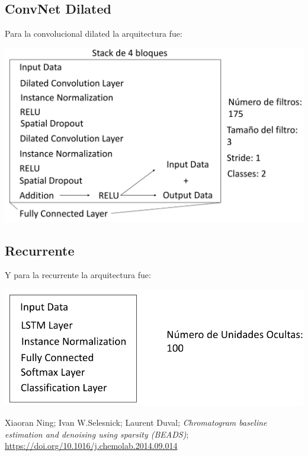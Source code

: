 \documentclass[a4paper,twocolumn]{article}
\begin{document}
\subsection{ConvNet Dilated}
Para la convolucional dilated la arquitectura fue:

	\includegraphics[trim={0cm 0cm 0cm 0cm}, clip,width=.5\textwidth]{./arqDilated.png}

\subsection{Recurrente}
Y para la recurrente la arquitectura fue:

\includegraphics[trim={0cm 0cm 0cm 0cm}, clip,width=.5\textwidth]{./arqRecurrent.png}



\begin{thebibliography}{9}

Xiaoran Ning; Ivan W.Selesnick; Laurent Duval; \emph{Chromatogram baseline estimation and denoising using sparsity (BEADS)};\\
\small\url{https://doi.org/10.1016/j.chemolab.2014.09.014}


\end{thebibliography}
\end{document}
